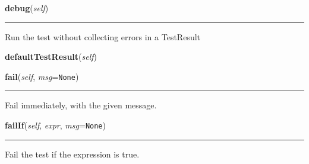     \begin{boxedminipage}{\textwidth}

    \raggedright \textbf{debug}(\textit{self})

    \vspace{-1.5ex}

    \rule{\textwidth}{0.5\fboxrule}
    Run the test without collecting errors in a TestResult

    \vspace{1ex}

    \end{boxedminipage}

    \label{unittest:TestCase:defaultTestResult}

    \vspace{0.5ex}

    \begin{boxedminipage}{\textwidth}

    \raggedright \textbf{defaultTestResult}(\textit{self})

    \end{boxedminipage}

    \label{unittest:TestCase:fail}

    \vspace{0.5ex}

    \begin{boxedminipage}{\textwidth}

    \raggedright \textbf{fail}(\textit{self}, \textit{msg}=\texttt{None})

    \vspace{-1.5ex}

    \rule{\textwidth}{0.5\fboxrule}
    Fail immediately, with the given message.

    \vspace{1ex}

    \end{boxedminipage}

    \label{unittest:TestCase:failIf}

    \vspace{0.5ex}

    \begin{boxedminipage}{\textwidth}

    \raggedright \textbf{failIf}(\textit{self}, \textit{expr}, \textit{msg}=\texttt{None})

    \vspace{-1.5ex}

    \rule{\textwidth}{0.5\fboxrule}
    Fail the test if the expression is true.

    \vspace{1ex}

    \end{boxedminipage}

